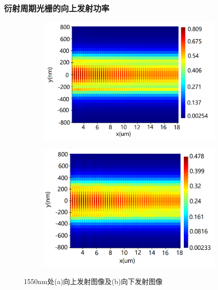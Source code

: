 \documentclass[UTF8,a4paper,12pt]{ctexart}
\numberwithin{equation}{section}
\begin{document}
\subsubsection{衍射周期光栅的向上发射功率}
\begin{figure}[htbp]
\centering
\vspace{-0.5cm} 
\begin{subfigure}[b]{0.5\textwidth}
\centering
\includegraphics[width=\textwidth]{fig35.png}
\subcaption{}
\end{subfigure}%
\hfill
\begin{subfigure}[b]{0.5\textwidth}
\centering
\includegraphics[width=\textwidth]{fig36.png}
\subcaption{}
\end{subfigure}%
\caption{1550nm处(a)向上发射图像及(b)向下发射图像}
\label{3-7}
\end{figure}
\end{document}
